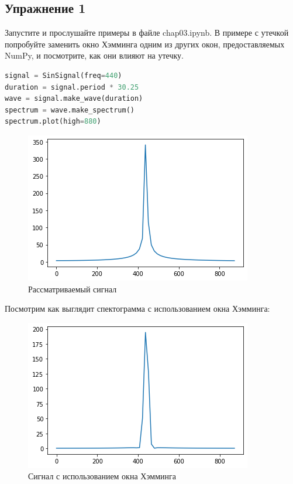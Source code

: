 \subsection{Упражнение 1}

Запустите и прослушайте примеры в файле chap03.ipynb. В примере с утечкой попробуйте заменить окно Хэмминга одним из других окон, предоставляемых NumPy, и посмотрите, как они влияют на утечку.

\begin{lstlisting}[language=Python]
signal = SinSignal(freq=440)
duration = signal.period * 30.25
wave = signal.make_wave(duration)
spectrum = wave.make_spectrum()
spectrum.plot(high=880)
\end{lstlisting}

\begin{figure}[H]
	\begin{center}
		\includegraphics[scale=1]{fig/lab03/lab03_4_0.png}
		\caption{Рассматриваемый сигнал}
	\end{center}
\end{figure}

Посмотрим как выглядит спектограмма с использованием окна Хэмминга:

\begin{figure}[H]
	\begin{center}
		\includegraphics[scale=1]{fig/lab03/lab03_6_0.png}
		\caption{Сигнал с использованием окна Хэмминга}
	\end{center}
\end{figure}

